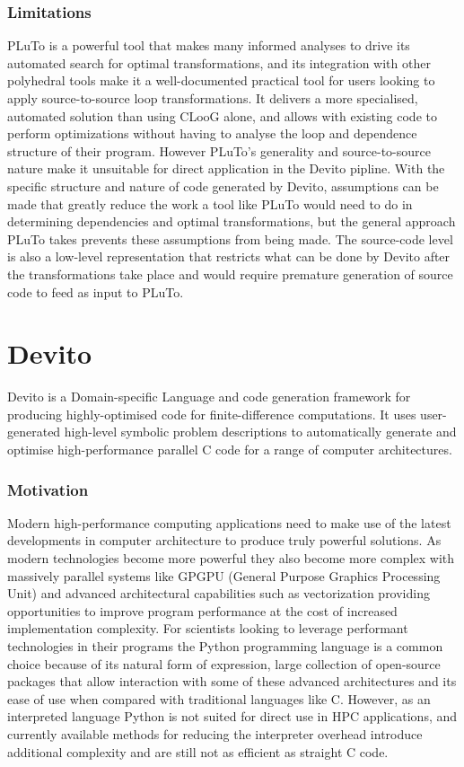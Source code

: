 \documentclass[a4paper,12pt,twoside]{report}
\begin{document}
\subsection*{Limitations}
PLuTo is a powerful tool that makes many informed analyses to drive its automated search for optimal transformations, and its integration
with other polyhedral tools make it a well-documented practical tool for users looking to apply source-to-source loop transformations. It
delivers a more specialised, automated solution than using CLooG alone, and allows with existing code to perform optimizations without having to 
analyse the loop and dependence structure of their program. However
PLuTo's generality and source-to-source nature make it unsuitable for direct application in the Devito pipline. With the specific structure and
nature of code generated by Devito, assumptions can be made that greatly reduce the work a tool like PLuTo would need to do in determining
dependencies and optimal transformations, but the general approach PLuTo takes prevents these assumptions from being made. The source-code level
is also a low-level representation that restricts what can be done by Devito after the transformations take place and would require premature
generation of source code to feed as input to PLuTo.

\chapter{Devito}
Devito is a Domain-specific Language and code generation framework for producing highly-optimised
code for finite-difference computations. It uses user-generated high-level symbolic problem descriptions to automatically
generate and optimise high-performance parallel C code for a range of computer architectures.
\subsection*{Motivation}
Modern high-performance computing applications need to make use of the latest developments in computer architecture to produce truly
powerful solutions. As modern technologies become more powerful they also become more complex with massively parallel systems like
GPGPU (General Purpose Graphics Processing Unit) and advanced architectural capabilities such as vectorization providing opportunities
to improve program performance at the cost of increased implementation complexity. For scientists looking to leverage performant
technologies in their programs the Python programming language is a common choice because of its natural form of expression,
large collection of open-source packages that allow interaction with some of these advanced architectures and its ease of use when compared with traditional languages like C.
However, as an interpreted language Python is not suited for direct use in HPC applications, and currently available methods for reducing the interpreter overhead introduce
additional complexity and are still not as efficient as straight C code. 
\end{document}
